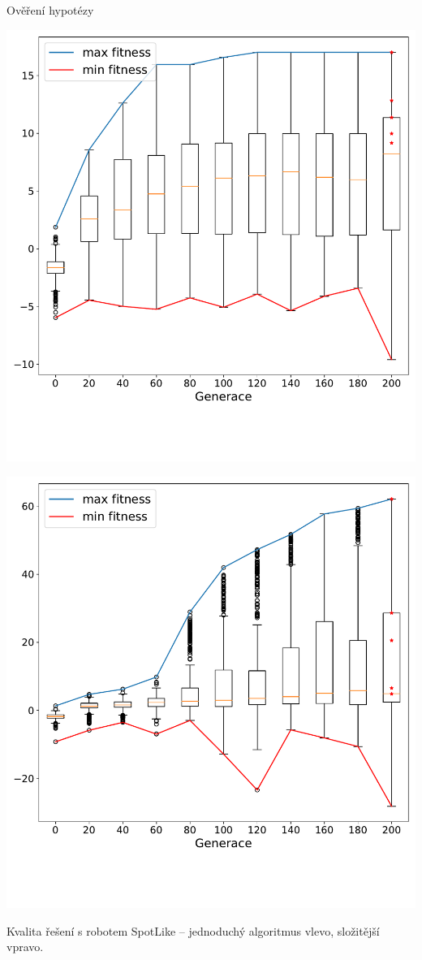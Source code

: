 \documentclass[portrait,a0paper,fontscale=0.25]{baposter}
\begin{document}
\begin{poster}
\begin{posterbox}[column=1, name=result1]{Ověření hypotézy}
\begin{minipage}{0.5\linewidth}
    \centering
    \includegraphics[width=1\linewidth]{./img/Sine_10.pdf}
\end{minipage}%
\begin{minipage}{0.5\linewidth}
    \centering
    \includegraphics[width=1\linewidth]{./img/TFS_10.pdf}
\end{minipage}
\begin{center}
    \vspace{-25px}
    \scriptsize{Kvalita řešení s robotem SpotLike -- jednoduchý algoritmus
    vlevo, složitější vpravo.}


\end{center}
\end{posterbox}
\end{poster}
\end{document}
